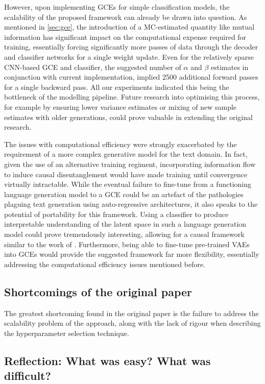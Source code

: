 However, upon implementing GCEs for simple classification models, the scalability of the proposed framework can already be drawn into question. As mentioned in \ref{sec:gce}, the introduction of a MC-estimated quantity like mutual information has significant impact on the computational expense required for training, essentially forcing significantly more passes of data through the decoder and classifier networks for a single weight update. Even for the relatively sparse CNN-based GCE and classifier, the suggested number of $\alpha$ and $\beta$ estimates in conjunction with current implementation, implied 2500 additional forward passes for a single backward pass. All our experiments indicated this being the bottleneck of the modelling pipeline. Future research into optimising this process, for example by ensuring lower variance estimates or mixing of new sample estimates with older generations, could prove valuable in extending the original research.

The issues with computational efficiency were strongly exacerbated by the requirement of a more complex generative model for the text domain. In fact, given the use of an alternative training regiment, incorporating information flow to induce causal disentanglement would have made training until convergence virtually intractable. While the eventual failure to fine-tune from a functioning language generation model to a GCE could be an artefact of the pathologies plaguing text generation using auto-regressive architectures, it also speaks to the potential of portability for this framework. Using a classifier to produce interpretable understanding of the latent space in such a language generation model could prove tremendously interesting, allowing for a causal framework similar to the work of \cite{hu2017toward}. Furthermore, being able to fine-tune pre-trained VAEs into GCEs would provide the suggested framework far more flexibility, essentially addressing the computational efficiency issues mentioned before. 

\subsection{Shortcomings of the original paper}

The greatest shortcoming found in the original paper is the failure to address the scalability problem of the approach, along with the lack of rigour when describing the hyperparameter selection technique. 

\subsection{Reflection: What was easy? What was difficult?}

